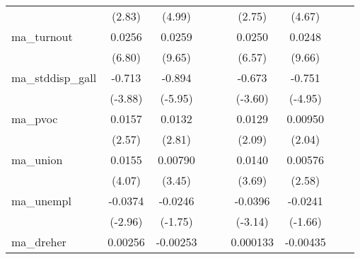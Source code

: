 {\begin{tabular}{l*{8}{c}}
            &      (2.83)         &      (4.99)         &                     &                     &      (2.75)         &      (4.67)         &                     &                     \\
[1em]
ma\_turnout  &      0.0256\sym{***}&      0.0259\sym{***}&                     &                     &      0.0250\sym{***}&      0.0248\sym{***}&                     &                     \\
            &      (6.80)         &      (9.65)         &                     &                     &      (6.57)         &      (9.66)         &                     &                     \\
[1em]
ma\_stddisp\_gall&      -0.713\sym{***}&      -0.894\sym{***}&                     &                     &      -0.673\sym{***}&      -0.751\sym{***}&                     &                     \\
            &     (-3.88)         &     (-5.95)         &                     &                     &     (-3.60)         &     (-4.95)         &                     &                     \\
[1em]
ma\_pvoc     &      0.0157\sym{*}  &      0.0132\sym{**} &                     &                     &      0.0129\sym{*}  &     0.00950\sym{*}  &                     &                     \\
            &      (2.57)         &      (2.81)         &                     &                     &      (2.09)         &      (2.04)         &                     &                     \\
[1em]
ma\_union    &      0.0155\sym{***}&     0.00790\sym{***}&                     &                     &      0.0140\sym{***}&     0.00576\sym{**} &                     &                     \\
            &      (4.07)         &      (3.45)         &                     &                     &      (3.69)         &      (2.58)         &                     &                     \\
[1em]
ma\_unempl   &     -0.0374\sym{**} &     -0.0246         &                     &                     &     -0.0396\sym{**} &     -0.0241         &                     &                     \\
            &     (-2.96)         &     (-1.75)         &                     &                     &     (-3.14)         &     (-1.66)         &                     &                     \\
[1em]
ma\_dreher   &     0.00256         &    -0.00253         &                     &                     &    0.000133         &    -0.00435         &                     &                     \\

\end{tabular}}
